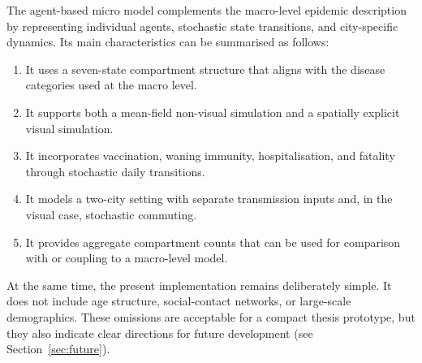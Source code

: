The agent-based micro model complements the macro-level epidemic description by representing individual agents, stochastic state transitions, and city-specific dynamics.
Its main characteristics can be summarised as follows:
\begin{enumerate}
  \item It uses a seven-state compartment structure that aligns with the disease categories used at the macro level.
  \item It supports both a mean-field non-visual simulation and a spatially explicit visual simulation.
  \item It incorporates vaccination, waning immunity, hospitalisation, and fatality through stochastic daily transitions.
  \item It models a two-city setting with separate transmission inputs and, in the visual case, stochastic commuting.
  \item It provides aggregate compartment counts that can be used for comparison with or coupling to a macro-level model.
\end{enumerate}
At the same time, the present implementation remains deliberately simple.
It does not include age structure, social-contact networks, or large-scale demographics.
These omissions are acceptable for a compact thesis prototype, but they also indicate clear directions for future development (see Section~\ref{sec:future}).
